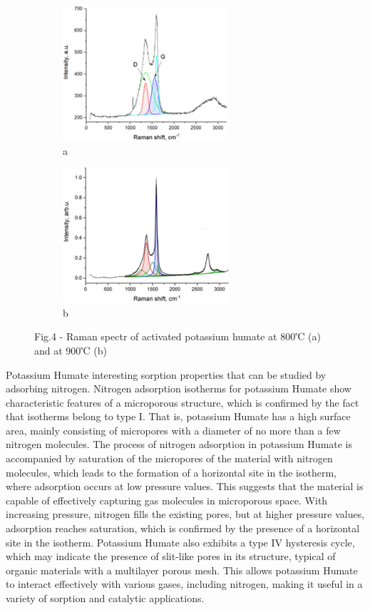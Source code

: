 \begin{figure}[H]
    \centering
    \begin{subfigure}[t]{0.45\textwidth}
        \centering
        \includegraphics[height=5cm]{media/chem2/image101}
        \caption*{a}
    \end{subfigure}
    \begin{subfigure}[t]{0.45\textwidth}
        \centering
        \includegraphics[height=5cm]{media/chem2/image102}
        \caption*{b}
    \end{subfigure}
    \caption*{Fig.4 - Raman spectr of activated potassium humate at 800℃ (a) and at 900℃ (b)}
\end{figure}

\begin{multicols}{2}
Potassium Humate interesting sorption properties that can be studied by
adsorbing nitrogen. Nitrogen adsorption isotherms for potassium Humate
show characteristic features of a microporous structure, which is
confirmed by the fact that isotherms belong to type I. That is,
potassium Humate has a high surface area, mainly consisting of
micropores with a diameter of no more than a few nitrogen molecules. The
process of nitrogen adsorption in potassium Humate is accompanied by
saturation of the micropores of the material with nitrogen molecules,
which leads to the formation of a horizontal site in the isotherm, where
adsorption occurs at low pressure values. This suggests that the
material is capable of effectively capturing gas molecules in
microporous space. With increasing pressure, nitrogen fills the existing
pores, but at higher pressure values, adsorption reaches saturation,
which is confirmed by the presence of a horizontal site in the isotherm.
Potassium Humate also exhibits a type IV hysteresis cycle, which may
indicate the presence of slit-like pores in its structure, typical of
organic materials with a multilayer porous mesh. This allows potassium
Humate to interact effectively with various gases, including nitrogen,
making it useful in a variety of sorption and catalytic applications.
\end{multicols}

